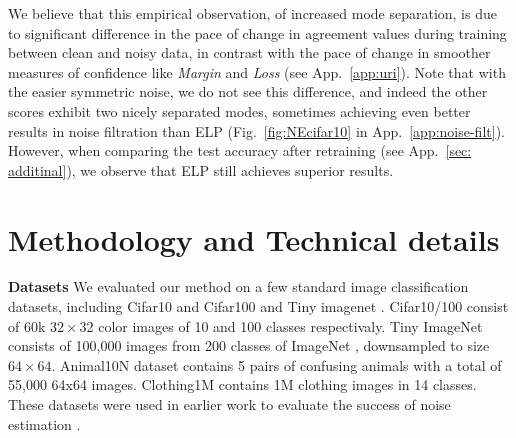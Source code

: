 \documentclass{article}
\newcommand{\myparagraph}[1]{\smallskip\noindent\textbf{#1}}
\begin{document}
We believe that this empirical observation, of increased mode separation, is due to significant difference in the pace of change in agreement values during training between clean and noisy data, in contrast with the pace of change in smoother measures of confidence like \emph{Margin} and \emph{Loss} (see App.~\ref{app:uri}). Note that with the easier symmetric noise, we do not see this difference, and indeed the other scores exhibit two nicely separated modes, sometimes achieving even better results in noise filtration than ELP (Fig.~\ref{fig:NEcifar10} in App.~\ref{app:noise-filt}). However, when comparing the test accuracy after retraining (see App.~\ref{sec: additinal}), we observe that ELP still achieves superior results. 


\section{Methodology and Technical details}
\label{app:tech}

\myparagraph{Datasets} We evaluated our method on a few standard image classification datasets, including Cifar10 and Cifar100  \citep{krizhevsky2009learning} and Tiny imagenet \citep{le2015tiny}. Cifar10/100 consist of 60k $32\times 32$ color images of 10 and 100 classes respectivaly. Tiny ImageNet consists of 100,000 images from 200 classes of ImageNet \citep{deng2009imagenet}, downsampled to size $64\times 64$. Animal10N  dataset contains 5 pairs of confusing animals with a total of 55,000 64x64 images. %
Clothing1M \citep{clothing} contains 1M clothing images in 14 classes. These datasets were used in earlier work to evaluate the success of noise estimation \citep{pleiss2020identifying,arazo2019unsupervised,li2020dividemix,liu2020early}.
\end{document}
